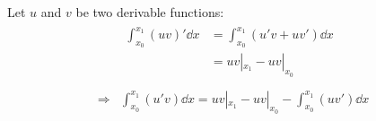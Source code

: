 Let $u$ and $v$ be two derivable functions:
\begin{equation}
\begin{split}
 & \begin{split}
        \int_{x_0}^{x_1}\left(u v\right)'\dd x & = \int_{x_0}^{x_1}\left(u' v + u v' \right)\dd x \\
                                               & = u v|_{x_1} - u v|_{x_0} \\
   \end{split}\\
\Rightarrow &
 \int_{x_0}^{x_1}\left(u' v\right) \dd x = u v|_{x_1} - u v|_{x_0} - \int_{x_0}^{x_1}\left( u v'\right) \dd x
\end{split}
\label{sec:math:ipp}
\end{equation}
